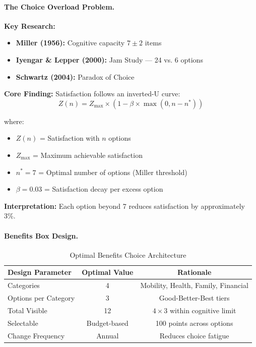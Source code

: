 \paragraph{The Choice Overload Problem.}

\begin{tcolorbox}[colback=orange!5!white, colframe=orange!75!black,
    title=\textbf{Literature Foundation: Optimal Menu Size}]

\textbf{Key Research:}
\begin{itemize}[nosep]
    \item \textbf{Miller (1956):} Cognitive capacity $7 \pm 2$ items
    \item \textbf{Iyengar \& Lepper (2000):} Jam Study --- 24 vs. 6 options
    \item \textbf{Schwartz (2004):} Paradox of Choice
\end{itemize}

\textbf{Core Finding:} Satisfaction follows an inverted-U curve:
\begin{equation}
Z(n) = Z_{\max} \times (1 - \beta \times \max(0, n - n^*))
\label{eq:hhh-choice-satisfaction}
\end{equation}

where:
\begin{itemize}[nosep]
    \item $Z(n)$ = Satisfaction with $n$ options
    \item $Z_{\max}$ = Maximum achievable satisfaction
    \item $n^* = 7$ = Optimal number of options (Miller threshold)
    \item $\beta = 0.03$ = Satisfaction decay per excess option
\end{itemize}

\textbf{Interpretation:} Each option beyond 7 reduces satisfaction by approximately 3\%.

\end{tcolorbox}

\paragraph{Benefits Box Design.}

\begin{table}[htbp]
\centering
\caption{Optimal Benefits Choice Architecture}
\label{tab:hhh-choice-architecture}
\renewcommand{\arraystretch}{1.3}
\begin{tabular}{@{}lcc@{}}
\toprule
\textbf{Design Parameter} & \textbf{Optimal Value} & \textbf{Rationale} \\
\midrule
Categories & 4 & Mobility, Health, Family, Financial \\
Options per Category & 3 & Good-Better-Best tiers \\
Total Visible & 12 & $4 \times 3$ within cognitive limit \\
Selectable & Budget-based & 100 points across options \\
Change Frequency & Annual & Reduces choice fatigue \\
\bottomrule
\end{tabular}
\end{table}

